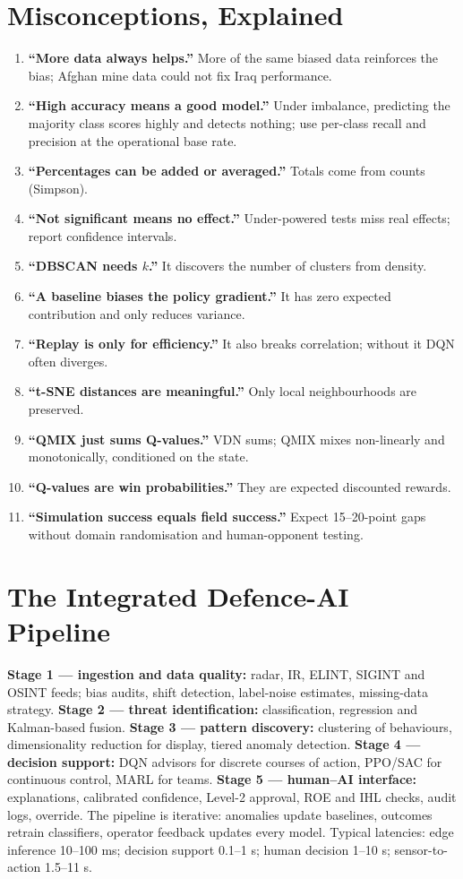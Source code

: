 \documentclass[11pt]{article}
\begin{document}
\section{Misconceptions, Explained}
\begin{enumerate}
\item \textbf{``More data always helps.''} More of the same biased data reinforces the bias; Afghan mine data could not fix Iraq performance.
\item \textbf{``High accuracy means a good model.''} Under imbalance, predicting the majority class scores highly and detects nothing; use per-class recall and precision at the operational base rate.
\item \textbf{``Percentages can be added or averaged.''} Totals come from counts (Simpson).
\item \textbf{``Not significant means no effect.''} Under-powered tests miss real effects; report confidence intervals.
\item \textbf{``DBSCAN needs $k$.''} It discovers the number of clusters from density.
\item \textbf{``A baseline biases the policy gradient.''} It has zero expected contribution and only reduces variance.
\item \textbf{``Replay is only for efficiency.''} It also breaks correlation; without it DQN often diverges.
\item \textbf{``t-SNE distances are meaningful.''} Only local neighbourhoods are preserved.
\item \textbf{``QMIX just sums Q-values.''} VDN sums; QMIX mixes non-linearly and monotonically, conditioned on the state.
\item \textbf{``Q-values are win probabilities.''} They are expected discounted rewards.
\item \textbf{``Simulation success equals field success.''} Expect 15--20-point gaps without domain randomisation and human-opponent testing.
\end{enumerate}

\section{The Integrated Defence-AI Pipeline}
\textbf{Stage 1 --- ingestion and data quality:} radar, IR, ELINT, SIGINT and OSINT feeds; bias audits, shift detection, label-noise estimates, missing-data strategy. \textbf{Stage 2 --- threat identification:} classification, regression and Kalman-based fusion. \textbf{Stage 3 --- pattern discovery:} clustering of behaviours, dimensionality reduction for display, tiered anomaly detection. \textbf{Stage 4 --- decision support:} DQN advisors for discrete courses of action, PPO/SAC for continuous control, MARL for teams. \textbf{Stage 5 --- human--AI interface:} explanations, calibrated confidence, Level-2 approval, ROE and IHL checks, audit logs, override. The pipeline is iterative: anomalies update baselines, outcomes retrain classifiers, operator feedback updates every model. Typical latencies: edge inference 10--100 ms; decision support 0.1--1 s; human decision 1--10 s; sensor-to-action 1.5--11 s.
\end{document}
